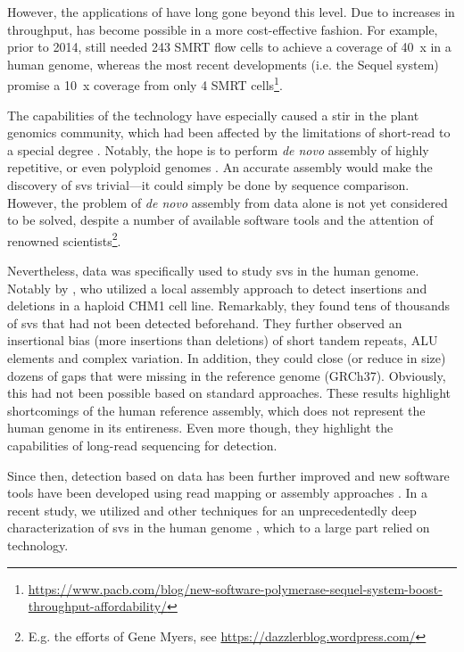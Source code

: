 However, the applications of \pacbio have long gone beyond this level. Due to
increases in throughput, \wgs has become possible in a more cost-effective
fashion. For example, prior to 2014, \citet{Chaisson2014} still needed 243 SMRT
flow cells to achieve a coverage of 40~x in a human genome, whereas the most
recent developments (i.e. the \pacbio Sequel system) promise a 10~x coverage
from only 4 SMRT cells\footnote{\label{footnote:pacbioblog}%
\url{https://www.pacb.com/blog/new-software-polymerase-sequel-system-boost-throughput-affordability/}}.

The capabilities of the \pacbio technology have especially caused a stir in the
plant genomics community, which had been affected by the limitations of
short-read \mps to a special degree \citep{Bickhart2014}. Notably, the hope is
to perform \textit{de novo} assembly of highly repetitive, or even polyploid
genomes \citep{Li2017}. An accurate assembly would make the discovery of \acp{sv}
trivial---it could simply be done by sequence comparison.
However, the problem of \textit{de novo} assembly from
\pacbio data alone is not yet considered to be solved, despite a number of
available software tools \citep{Chin2013,Chin2016,Koren2017,Koren2018} and the
attention of renowned scientists\footnote{E.g. the efforts of Gene Myers, see
\url{https://dazzlerblog.wordpress.com/}}.

Nevertheless, \pacbio \wgs data was specifically used to study \acp{sv} in the
human genome. Notably by \citet{Chaisson2014}, who utilized a local assembly approach to detect
insertions and deletions in a haploid CHM1 cell line. Remarkably, they found
tens of thousands of \acp{sv} that had not been detected beforehand. They further
observed an insertional bias (more insertions than deletions) of short tandem
repeats, ALU elements and complex variation. In addition, they could close (or
reduce in size) dozens of gaps that were missing in the reference genome
(GRCh37). Obviously, this had not been possible based on standard \mps
approaches. These results highlight shortcomings of the human reference assembly,
which does not represent the human genome in its entireness. Even more though,
they highlight the capabilities of long-read sequencing for \sv detection.

Since then, \sv detection based on \pacbio data has been further improved and
new software tools have been developed using read mapping or assembly approaches
\citep{Pendleton2015,Huddleston2017}. In a recent study, we utilized \pacbio and
other techniques for an unprecedentedly deep characterization of \acp{sv} in
the human genome \citep{Chaisson2017}, which to a large part relied on \pacbio
technology.

